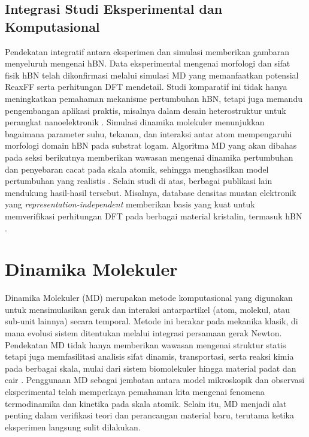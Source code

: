 \subsection{Integrasi Studi Eksperimental dan Komputasional}
Pendekatan integratif antara eksperimen dan simulasi memberikan gambaran menyeluruh mengenai hBN.
Data eksperimental mengenai morfologi dan sifat fisik hBN telah dikonfirmasi melalui simulasi MD yang memanfaatkan potensial ReaxFF serta perhitungan DFT mendetail.
Studi komparatif ini tidak hanya meningkatkan pemahaman mekanisme pertumbuhan hBN, tetapi juga memandu pengembangan aplikasi praktis, misalnya dalam desain heterostruktur untuk perangkat nanoelektronik \cite{Lele2022}.
Simulasi dinamika molekuler menunjukkan bagaimana parameter suhu, tekanan, dan interaksi antar atom mempengaruhi morfologi domain hBN pada substrat logam.
Algoritma MD yang akan dibahas pada seksi berikutnya memberikan wawasan mengenai dinamika pertumbuhan dan penyebaran cacat pada skala atomik, sehingga menghasilkan model pertumbuhan yang realistis \cite{Lele2022}.
Selain studi di atas, berbagai publikasi lain mendukung hasil-hasil tersebut.
Misalnya, database densitas muatan elektronik yang \emph{representation-independent} memberikan basis yang kuat untuk memverifikasi perhitungan DFT pada berbagai material kristalin, termasuk hBN \cite{Shen2022}.

\section{Dinamika Molekuler}
Dinamika Molekuler (MD) merupakan metode komputasional yang digunakan untuk mensimulasikan gerak dan interaksi antarpartikel (atom, molekul, atau sub-unit lainnya) secara temporal.
Metode ini berakar pada mekanika klasik, di mana evolusi sistem ditentukan melalui integrasi persamaan gerak Newton.
Pendekatan MD tidak hanya memberikan wawasan mengenai struktur statis tetapi juga memfasilitasi analisis sifat dinamis, transportasi, serta reaksi kimia pada berbagai skala, mulai dari sistem biomolekuler hingga material padat dan cair \cite{Allen1989,Frenkel2001}.
Penggunaan MD sebagai jembatan antara model mikroskopik dan observasi eksperimental telah memperkaya pemahaman kita mengenai fenomena termodinamika dan kinetika pada skala atomik.
Selain itu, MD menjadi alat penting dalam verifikasi teori dan perancangan material baru, terutama ketika eksperimen langsung sulit dilakukan.

